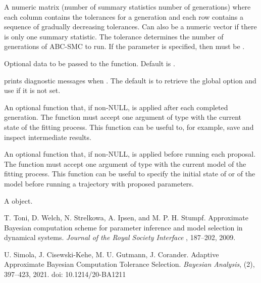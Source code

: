 \documentclass[letterpaper]{book}
\begin{document}
\begin{Arguments}
\begin{ldescription}
\item[\code{tolerance}] A numeric matrix (number of summary statistics
\eqn{\times}{} number of generations) where each column contains
the tolerances for a generation and each row contains a
sequence of gradually decreasing tolerances. Can also be a
numeric vector if there is only one summary statistic. The
tolerance determines the number of generations of ABC-SMC to
run. If the  parameter is specified, then
 must be .

\item[\code{data}] Optional data to be passed to the 
function. Default is .

\item[\code{verbose}] prints diagnostic messages when . The
default is to retrieve the global option  and
use  if it is not set.

\item[\code{post\_gen}] An optional function that, if non-NULL, is applied
after each completed generation. The function must accept one
argument of type  with the current state of
the fitting process. This function can be useful to, for
example, save and inspect intermediate results.

\item[\code{init\_model}] An optional function that, if non-NULL, is
applied before running each proposal. The function must accept
one argument of type  with the current
model of the fitting process. This function can be useful to
specify the initial state of  or  of the
model before running a trajectory with proposed parameters.
\end{ldescription}
\end{Arguments}
%
\begin{Value}
A  object.
\end{Value}
%
\begin{References}
T. Toni, D. Welch, N. Strelkowa, A. Ipsen, and M. P. H. Stumpf. Approximate Bayesian computation scheme for parameter inference and model selection in dynamical systems. \emph{Journal of the Royal Society Interface} , 187--202, 2009. 

U. Simola, J. Cisewski-Kehe, M. U. Gutmann, J. Corander. Adaptive Approximate Bayesian Computation Tolerance Selection. \emph{Bayesian Analysis}, (2), 397--423, 2021. doi: 10.1214/20-BA1211
\end{References}
\end{document}
